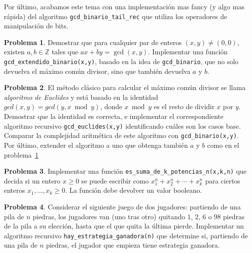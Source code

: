 \documentclass[a4paper, 11pt]{article}
\newcommand{\ZZ}{\mathbb{Z}}
\newcounter{numerodetema}
\theoremstyle{plain}
\theoremstyle{definition}
\newtheorem{prob}{Problema}[numerodetema]
\begin{document}
\bigskip



\bigskip

Por último, acabamos este tema con una implementación mas fancy (y algo mas
rápida) del algoritmo \texttt{gcd\_binario\_tail\_rec} que utiliza los operadores
de manipulación de bits.

\bigskip



\bigskip

\begin{prob}\label{prob_gcd_binario}
Demostrar que para cualquier par de enteros
$(x,y)\neq(0,0)$, existen $a,b\in\ZZ$ tales que $ax+by=\gcd(x,y)$.
Implementar una función \texttt{gcd\_extendido\_binario(x,y)}, basado
en la idea de \texttt{gcd\_binario}, que no solo devuelva el máximo
común divisor, sino que también devuelva $a$ y $b$.
\end{prob}

\begin{prob}
El método clásico para calcular el máximo
común divisor se llama \emph{algoritmo de Euclides} y está basado
en la identidad $gcd(x,y)=gcd(y,x\bmod y)$, donde $x\bmod y$ es
el resto de dividir $x$ por $y$. Demostrar que la identidad es
correcta, e implementar el correspondiente algoritmo recursivo
\texttt{gcd\_euclides(x,y)} identificando cuáles son los casos
base. Comparar la complejidad aritmética de este algoritmo con
\texttt{gcd\_binario(x,y)}. Por último, extender el algoritmo a
uno que obtenga también $a$ y $b$ como en el problema~\ref{prob_gcd_binario}
\end{prob}

\begin{prob}
Implementar una función
\texttt{es\_suma\_de\_k\_potencias\_n(x,k,n)} que decida si un
entero $x\geq0$ se puede escribir como $x_1^n+x_2^n+\cdots+x_k^n$ para
ciertos enteros $x_1,\ldots,x_k\geq 0$. La función debe devolver un
valor booleano.
\end{prob}

\begin{prob}
Considerar el siguiente juego de dos jugadores:
partiendo de una pila de $n$ piedras, los jugadores van (uno tras
otro) quitando $1$, $2$, $6$ o $98$ piedras de la pila a su elección, hasta
que el que quita la última pierde. Implementar un algoritmo recursivo
\texttt{hay\_estrategia\_ganadora(n)} que determine si, partiendo
de una pila de $n$ piedras, el jugador que empieza tiene estrategia
ganadora.
\end{prob}
\end{document}
